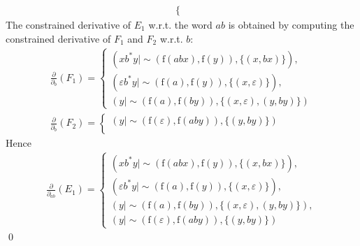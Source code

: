 \documentclass[a4paper]{llncs}
\begin{document}
\begin{example}
\begin{align*}
\begin{cases}
        \end{cases}
        \end{align*}
        The constrained derivative of $E_1$ w.r.t. the word $ab$ is obtained by computing the constrained derivative of $F_1$ and $F_2$ w.r.t. $b$:   
        \begin{align*}
        \frac{\partial}{\partial_b}(F_1)=
      \begin{cases}
          (xb^*y\mid \sim(\mathrm{f}(abx),\mathrm{f}(y)),\{(x,bx)\}),\\
          (\varepsilon b^*y\mid \sim(\mathrm{f}(a),\mathrm{f}(y)),\{(x,\varepsilon)\}),\\
          (y\mid \sim(\mathrm{f}(a),\mathrm{f}(by)),\{(x,\varepsilon),(y,by)\})
        \end{cases}\\
        \frac{\partial}{\partial_b}(F_2)=
      \begin{cases}
          (y\mid \sim(\mathrm{f}(\varepsilon),\mathrm{f}(aby)),\{(y,by)\})\\
        \end{cases}
        \end{align*}
        Hence
        \begin{align*}
        \frac{\partial}{\partial_{ab}}(E_1)=
      \begin{cases}
          (xb^*y\mid \sim(\mathrm{f}(abx),\mathrm{f}(y)),\{(x,bx)\}),\\
          (\varepsilon b^*y\mid \sim(\mathrm{f}(a),\mathrm{f}(y)),\{(x,\varepsilon)\}),\\
          (y\mid \sim(\mathrm{f}(a),\mathrm{f}(by)),\{(x,\varepsilon),(y,by)\}),\\
          (y\mid \sim(\mathrm{f}(\varepsilon),\mathrm{f}(aby)),\{(y,by)\})
        \end{cases}
        \end{align*}
    \qed
  \end{example}
  
\end{document}

